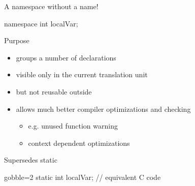 \begin{advanced}
\begin{frame}[fragile]
  \begin{exampleblock}{A namespace without a name!}
    \begin{cppcode*}{}
      namespace {
        int localVar;
      }
    \end{cppcode*}
  \end{exampleblock}
  \begin{block}{Purpose}
    \begin{itemize}
    \item groups a number of declarations
    \item visible only in the current translation unit
    \item but not reusable outside
    \item allows much better compiler optimizations and checking
      \begin{itemize}
      \item e.g. unused function warning
      \item context dependent optimizations
      \end{itemize}
    \end{itemize}
  \end{block}
  \begin{alertblock}{Supersedes static}
    \begin{cppcode*}{gobble=2}
      static int localVar; // equivalent C code
    \end{cppcode*}
  \end{alertblock}
\end{frame}
\end{advanced}
